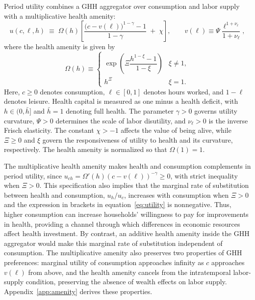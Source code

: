 \documentclass[12pt,a4paper]{article}
\begin{document}
Period utility combines a GHH aggregator over consumption and labor supply with a multiplicative health amenity:
\begin{equation}
\label{eq:utility}
u(c, \ell, h) \;\equiv\; \Omega(h) \left[ \frac{\bigl(c - v(\ell)\bigr)^{1-\gamma} - 1}{1 - \gamma} \;+\; \chi \right],
\qquad
v(\ell) \equiv \Psi \frac{\ell^{1+\nu_\ell}}{1+\nu_\ell},
\end{equation}
where the health amenity is given by
\begin{equation}
\label{eq:amenity}
\Omega(h) \equiv
\begin{cases}
\exp\!\left(\Xi \dfrac{h^{1-\xi} - 1}{1-\xi}\right) & \xi \neq 1,\\[8pt]
h^{\Xi} & \xi = 1.
\end{cases}
\end{equation}
Here, $c \geq 0$ denotes consumption, $\ell \in [0,1]$ denotes hours worked, and $1-\ell$ denotes leisure. Health capital is measured as one minus a health deficit, with $h \in (0,\bar h]$ and $\bar h=1$ denoting full health. The parameter $\gamma > 0$ governs utility curvature, $\Psi > 0$ determines the scale of labor disutility, and $\nu_\ell > 0$ is the inverse Frisch elasticity. The constant $\chi > -1$ affects the value of being alive, while $\Xi \geq 0$ and $\xi$ govern the responsiveness of utility to health and its curvature, respectively. The health amenity is normalized so that $\Omega(1)=1$.


The multiplicative health amenity makes health and consumption complements in period utility, since $u_{ch} = \Omega'(h)(c-v(\ell))^{-\gamma} \geq 0$, with strict inequality when $\Xi > 0$. This specification also implies that the marginal rate of substitution between health and consumption, $u_h/u_c$, increases with consumption when $\Xi > 0$ and the expression in brackets in equation~\eqref{eq:utility} is nonnegative. Thus, higher consumption can increase households' willingness to pay for improvements in health, providing a channel through which differences in economic resources affect health investment. By contrast, an additive health amenity inside the GHH aggregator would make this marginal rate of substitution independent of consumption. The multiplicative amenity also preserves two properties of GHH preferences: marginal utility of consumption approaches infinity as $c$ approaches $v(\ell)$ from above, and the health amenity cancels from the intratemporal labor-supply condition, preserving the absence of wealth effects on labor supply. Appendix~\ref{app:amenity} derives these properties.
\end{document}
